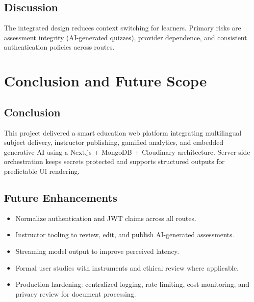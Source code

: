 \documentclass[a4paper,12pt,openany]{report}
\begin{document}
\section{Discussion}
The integrated design reduces context switching for learners. Primary risks are assessment integrity (AI-generated quizzes), provider dependence, and consistent authentication policies across routes.

\chapter{Conclusion and Future Scope}

\section{Conclusion}
This project delivered a smart education web platform integrating multilingual subject delivery, instructor publishing, gamified analytics, and embedded generative AI using a Next.js + MongoDB + Cloudinary architecture. Server-side orchestration keeps secrets protected and supports structured outputs for predictable UI rendering.

\section{Future Enhancements}
\begin{itemize}[leftmargin=*]
\item Normalize authentication and JWT claims across all routes.
\item Instructor tooling to review, edit, and publish AI-generated assessments.
\item Streaming model output to improve perceived latency.
\item Formal user studies with instruments and ethical review where applicable.
\item Production hardening: centralized logging, rate limiting, cost monitoring, and privacy review for document processing.
\end{itemize}
\end{document}
